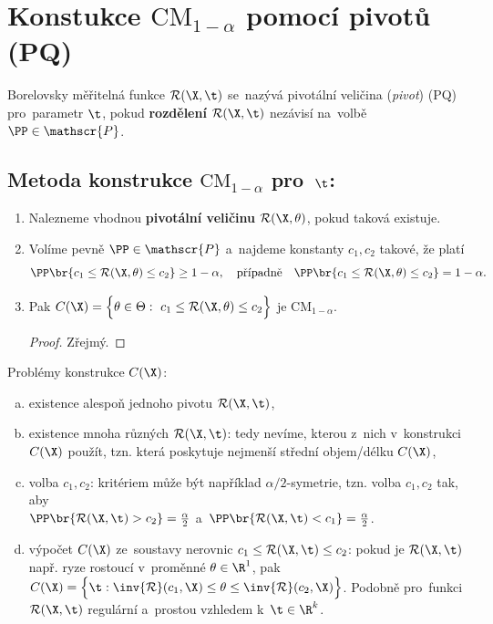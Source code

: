 \section{Konstukce $\mathrm{CM}_{1-\alpha}$ pomocí pivotů (PQ)}\label{pivoty}
\begin{define}
	Borelovsky měřitelná funkce $\mathcal{R}(\X,\t)$ se~nazývá pivotální veličina (\textit{pivot}) (PQ) pro~parametr $\t$, pokud \textbf{rozdělení} $\mathcal{R}(\X,\t)$ nezávisí na~volbě $\PP\in\mathscr{P}$.
\end{define}

\subsection*{Metoda konstrukce $\mathrm{CM}_{1-\alpha}$ pro~$\t$:}
	\begin{enumerate}[1)]
		\item Nalezneme vhodnou \textbf{pivotální veličinu}  $\mathcal{R}(\X,\theta)$, pokud taková existuje. 
		\item Volíme pevně $\PP\in\mathscr{P}$ a~najdeme konstanty $c_1,c_2$ takové, že platí 
	$$ \PP\br{c_1\leq \mathcal{R}(\X,\theta)\leq c_2}\geq 1-\alpha,\quad \text{případně}\quad\PP\br{c_1\leq \mathcal{R}(\X,\theta)\leq c_2}=1-\alpha. $$ 
	\item Pak $C(\X)=\Big\{ \theta\in\Theta:~c_1\leq \mathcal{R}(\X,\theta)\leq c_2 \Big\}$ je $\mathrm{CM}_{1-\alpha}$.
	\begin{proof}
		Zřejmý.
	\end{proof}
	\end{enumerate}

Problémy konstrukce $C(\X)$:\begin{enumerate}[a)]
	\item existence alespoň jednoho pivotu $\mathcal{R}(\X,\t)$,
	\item existence mnoha různých $\mathcal{R}(\X,\t)$: tedy nevíme, kterou z~nich v~konstrukci $C(\X)$ použít, tzn. která poskytuje nejmenší střední objem/délku $C(\X)$,
	\item volba $c_1,c_2$: kritériem může být například  $\alpha/2$-symetrie, tzn. volba $c_1,c_2$ tak, aby\\ $\PP\br{\mathcal{R}(\X,\t)>c_2}=\frac{\alpha}{2}$ a~$\PP\br{\mathcal{R}(\X,\t)<c_1}=\frac{\alpha}{2}$.
	\item výpočet $C(\X)$ ze~soustavy nerovnic $c_1\leq \mathcal{R}(\X,\t)\leq c_2$: pokud je $\mathcal{R}(\X,\t)$ např. ryze rostoucí v~proměnné $\theta\in\R^1$, pak $C(\X)=\Big\{\t: \inv{\mathcal{R}}(c_1,\X)\leq \theta\leq \inv{\mathcal{R}}(c_2,\X) \Big\} $. Podobně pro~funkci $\mathcal{R}(\X,\t)$ regulární a~prostou vzhledem k~$\t\in\R^k$.
\end{enumerate}



